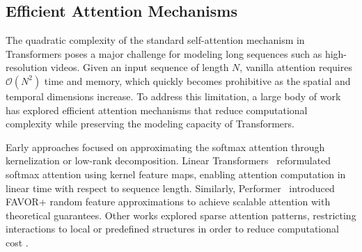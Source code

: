 \documentclass{llmxive}
\begin{document}

\subsection{Efficient Attention Mechanisms}

The quadratic complexity of the standard self-attention mechanism in Transformers poses a major challenge for modeling long sequences such as high-resolution videos. Given an input sequence of length $N$, vanilla attention requires $\mathcal{O}(N^2)$ time and memory, which quickly becomes prohibitive as the spatial and temporal dimensions increase. To address this limitation, a large body of work has explored efficient attention mechanisms that reduce computational complexity while preserving the modeling capacity of Transformers.

Early approaches focused on approximating the softmax attention through kernelization or low-rank decomposition. Linear Transformers~\cite{katharopoulos2020transformers} reformulated softmax attention using kernel feature maps, enabling attention computation in linear time with respect to sequence length. Similarly, Performer~\cite{choromanski2020rethinking} introduced FAVOR+ random feature approximations to achieve scalable attention with theoretical guarantees. Other works explored sparse attention patterns, restricting interactions to local or predefined structures in order to reduce computational cost \cite{child2019generating,beltagy2020longformer,zaheer2020big}.
\end{document}
